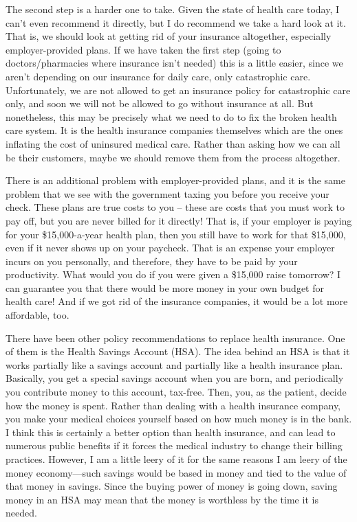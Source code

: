 The second step is a harder one to take. Given the state of health care
today, I can't even recommend it directly, but I do
recommend we take a hard look at it. That is, we should look at getting rid of your
insurance altogether, especially employer-provided plans.
If we have taken the
first step (going to doctors/pharmacies where insurance
isn't needed) this is a little easier, since we
aren't depending on our insurance for daily care, only
catastrophic care.  Unfortunately, we are not allowed to get an
insurance policy for catastrophic care only, and soon we will not be
allowed to go without insurance at all.  But nonetheless, this may be
precisely what we need to do to fix the broken health care system.  It
is the health insurance companies themselves which are the ones
inflating the cost of uninsured medical care.  Rather than asking how
we can all be their customers, maybe we should remove them from the
process altogether.

There is an additional problem with employer-provided plans, and it
is the same problem that we see with the government taxing you before
you receive your check.  These plans are true costs to you – these are
costs that you must work to pay off, but you are never billed for it
directly!  That is, if your employer is paying for your \$15,000-a-year
health plan, then you still have to work for that \$15,000, even if it
never shows up on your paycheck. That is an expense your employer
incurs on you personally, and therefore, they have to be paid by
your productivity. What would you do if you were given a \$15,000 raise
tomorrow?  I can guarantee you that there would be more money in your
own budget for health care!  And if we got rid of the insurance
companies, it would be a lot more affordable, too.

There have been other policy recommendations to replace health
insurance.  One of them is the Health Savings Account (HSA).  The idea
behind an HSA is that it works partially like a savings account and
partially like a health insurance plan.  Basically, you get a special
savings account when you are born, and periodically you contribute
money to this account, tax-free.  Then, you, as the patient, decide how
the money is spent.  Rather than dealing with a health insurance
company, you make your medical choices yourself based on how much money
is in the bank.  I think this is certainly a better option than health
insurance, and can lead to numerous public benefits if it forces the
medical industry to change their billing practices.  However, I am a
little leery of it for the same reasons I am leery of the money economy---such 
savings would be based in money and tied to the value of that
money in savings.  Since the buying power of money is going down,
saving money in an HSA may mean that the money is worthless by the time
it is needed.

